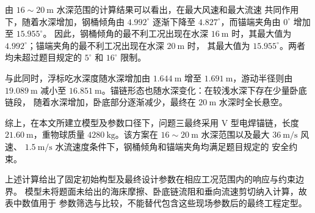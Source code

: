 由 \(16\sim20~\mathrm m\) 水深范围的计算结果可以看出，在最大风速和最大流速
共同作用下，随着水深增加，钢桶倾角由 \(4.992^\circ\) 逐渐下降至
\(4.827^\circ\)，而锚端夹角由 \(0^\circ\) 增加至 \(15.955^\circ\)。
因此，钢桶倾角的最不利工况出现在水深 \(16~\mathrm m\) 时，其最大值为
\(4.992^\circ\)；锚端夹角的最不利工况出现在水深 \(20~\mathrm m\) 时，
其最大值为 \(15.955^\circ\)。两者均未超过题目规定的 \(5^\circ\) 和
\(16^\circ\) 限制。

与此同时，浮标吃水深度随水深增加由 \(1.644~\mathrm m\) 增至
\(1.691~\mathrm m\)，游动半径则由 \(19.089~\mathrm m\) 减小至
\(16.851~\mathrm m\)。锚链形态也随水深变化：在较浅水深下存在少量卧底链段，
随着水深增加，卧底部分逐渐减少，最终在 \(20~\mathrm m\) 水深时全长悬空。

综上，在本文所建立模型及参数口径下，问题三最终采用 V 型电焊锚链，长度
\(21.60~\mathrm m\)，重物球质量 \(4280~\mathrm{kg}\)。该方案在
\(16\sim20~\mathrm m\) 水深范围以及最大 \(36~\mathrm{m/s}\) 风速、
\(1.5~\mathrm{m/s}\) 水流速度条件下，钢桶倾角和锚端夹角均满足题目规定的
安全约束。

上述计算给出了固定初始构型及最终设计参数在相应工况范围内的响应与约束边界。
模型未将题面未给出的海床摩擦、卧底链流阻和垂向流速剪切纳入计算，故表中数值用于
参数筛选与比较，不能替代包含这些现场参数后的最终工程定型。